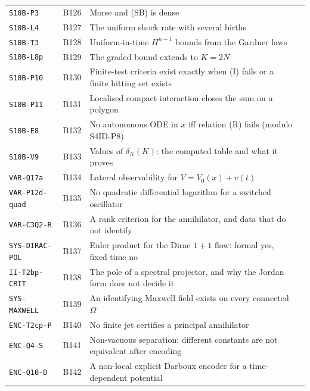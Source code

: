 \begin{center}
\begin{longtable}{@{}L{3.6cm}L{1.2cm}L{8.0cm}L{1.2cm}@{}}
\texttt{S10B-P3} & B126 & Morse and (SB) is dense & \pageref{dim:S10B-P3}\\
\texttt{S10B-L4} & B127 & The uniform shock rate with several births & \pageref{dim:S10B-L4}\\
\texttt{S10B-T3} & B128 & Uniform-in-time $H^{n-1}$ bounds from the Gardner laws & \pageref{dim:S10B-T3}\\
\texttt{S10B-L8p} & B129 & The graded bound extends to $K=2N$ & \pageref{dim:S10B-L8p}\\
\texttt{S10B-P10} & B130 & Finite-test criteria exist exactly when (I) fails or a finite hitting set exists & \pageref{dim:S10B-P10}\\
\texttt{S10B-P11} & B131 & Localised compact interaction closes the sum on a polygon & \pageref{dim:S10B-P11}\\
\texttt{S10B-E8} & B132 & No autonomous ODE in $x$ iff relation (R) fails (modulo S4ID-P8) & \pageref{dim:S10B-E8}\\
\texttt{S10B-V9} & B133 & Values of $\delta_N(K)$: the computed table and what it proves & \pageref{dim:S10B-V9}\\
\texttt{VAR-Q17a} & B134 & Lateral observability for $V=V_0(x)+v(t)$ & \pageref{dim:VAR-Q17a}\\
\texttt{VAR-P12d-quad} & B135 & No quadratic differential logarithm for a switched oscillator & \pageref{dim:VAR-P12d-quad}\\
\texttt{VAR-C3Q2-R} & B136 & A rank criterion for the annihilator, and data that do not identify & \pageref{dim:VAR-C3Q2-R}\\
\texttt{SYS-DIRAC-POL} & B137 & Euler product for the Dirac $1{+}1$ flow: formal yes, fixed time no & \pageref{dim:SYS-DIRAC-POL}\\
\texttt{II-T2bp-CRIT} & B138 & The pole of a spectral projector, and why the Jordan form does not decide it & \pageref{dim:II-T2bp-CRIT}\\
\texttt{SYS-MAXWELL} & B139 & An identifying Maxwell field exists on every connected $\Omega$ & \pageref{dim:SYS-MAXWELL}\\
\texttt{ENC-T2cp-P} & B140 & No finite jet certifies a principal annihilator & \pageref{dim:ENC-T2cp-P}\\
\texttt{ENC-Q4-S} & B141 & Non-vacuous separation: different constants are not equivalent after encoding & \pageref{dim:ENC-Q4-S}\\
\texttt{ENC-Q10-D} & B142 & A non-local explicit Darboux encoder for a time-dependent potential & \pageref{dim:ENC-Q10-D}\\

\end{longtable}
\end{center}
